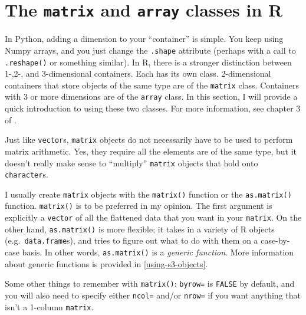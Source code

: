 \documentclass[
  12pt,
  krantz2]{krantz}
\begin{document}
\hypertarget{the-matrix-and-array-classes-in-r}{%
\section{\texorpdfstring{The \texttt{matrix} and \texttt{array} classes in R}{The matrix and array classes in R}}\label{the-matrix-and-array-classes-in-r}}

In Python, adding a dimension to your ``container'' is simple. You keep using Numpy arrays, and you just change the \texttt{.shape} attribute (perhaps with a call to \texttt{.reshape()} or something similar). In R, there is a stronger distinction between 1-,2-, and 3-dimensional containers. Each has its own class. 2-dimensional containers that store objects of the same type are of the \texttt{matrix} class. Containers with 3 or more dimensions are of the \texttt{array} class. In this section, I will provide a quick introduction to using these two classes. For more information, see chapter 3 of \citep{matloff_r_book}.

Just like \texttt{vector}s, \texttt{matrix} objects do not necessarily have to be used to perform matrix arithmetic. Yes, they require all the elements are of the same type, but it doesn't really make sense to ``multiply'' \texttt{matrix} objects that hold onto \texttt{character}s.

I usually create \texttt{matrix} objects with the \texttt{matrix()} function or the \texttt{as.matrix()} function. \texttt{matrix()} is to be preferred in my opinion. The first argument is explicitly a \texttt{vector} of all the flattened data that you want in your \texttt{matrix}. On the other hand, \texttt{as.matrix()} is more flexible; it takes in a variety of R objects (e.g.~\texttt{data.frame}s), and tries to figure out what to do with them on a case-by-case basis. In other words, \texttt{as.matrix()} is a \emph{generic function}. More information about generic functions is provided in \ref{using-s3-objects}.

Some other things to remember with \texttt{matrix()}: \texttt{byrow=} is \texttt{FALSE} by default, and you will also need to specify either \texttt{ncol=} and/or \texttt{nrow=} if you want anything that isn't a 1-column \texttt{matrix}.
\end{document}
